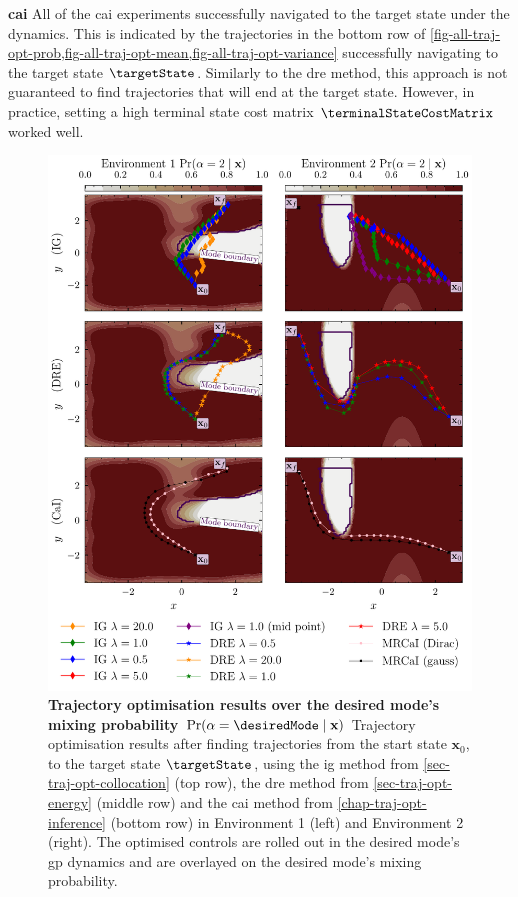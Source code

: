 \documentclass{mimosis-class/mimosis}
\numberwithin{equation}{chapter}
\newcommand{\state}{\ensuremath{\mathbf{x}}}
\newcommand{\modeVar}{\ensuremath{\alpha}}
\begin{document}
{\textbf{\acrfull{cai}}
All of the \acrshort{cai} experiments successfully navigated to the target state under the dynamics.
This is indicated by the trajectories in
the bottom row of \cref{fig-all-traj-opt-prob,fig-all-traj-opt-mean,fig-all-traj-opt-variance}
successfully navigating to the target state \(\targetState\).
Similarly to the \acrshort{dre} method, this approach is not guaranteed
to find trajectories that will end at the target state.
However, in practice, setting a high terminal state cost matrix \(\terminalStateCostMatrix\) worked well.

\begin{figure}
\centering
\includegraphics[width=\textwidth]{./images/mode-opt/trajectory_optimisation/all_trajectories_over_prob_both_scenarios.pdf}
\caption[Trajectory optimisation results over desired mode's mixing probability]{\textbf{Trajectory optimisation results over the desired mode's mixing probability  $\Pr(\modeVar=\desiredMode \mid \state)$}
Trajectory optimisation results after finding trajectories from the start state $\state_0$,
to the target state $\targetState$, using the \acrfull{ig} method
from \cref{sec-traj-opt-collocation}
(top row), the \acrfull{dre} method from \cref{sec-traj-opt-energy} (middle row) and the
\acrfull{cai} method from \cref{chap-traj-opt-inference} (bottom row) in Environment 1 (left)
and Environment 2 (right).
The optimised controls are rolled out in the desired mode's \acrshort{gp} dynamics and are overlayed on the
desired mode's mixing probability.}
\label{fig-all-traj-opt-prob}
\end{figure}

}
\end{document}
